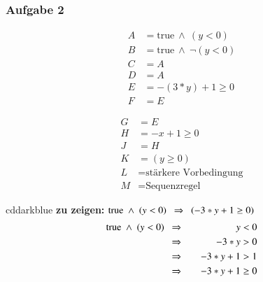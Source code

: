 \documentclass[aspectratio=1610,onlymath, ngerman, handout]{beamer}
\renewcommand{\emph}[1]{\textbf{#1}}
\newcommand{\logand}{ \ \land \ }
\begin{document}
	\begin{frame} \frametitle{Aufgabe 2}
		\pause
		\begin{minipage}{\dimexpr0.5\linewidth-\fboxrule-\fboxsep}
			\begin{align*}
				A &= \text{true} \logand (y < 0) \\
				B &= \text{true} \logand \lnot(y < 0) \\
				C &= A \\
				D &= A \\
				E &= -(3*y) + 1 \ge 0 \\
				F &= E 
				\end{align*}
		\end{minipage}
		\begin{minipage}{\dimexpr0.5\linewidth-\fboxrule-\fboxsep}
			\begin{align*}
				G &= E \\
				H &= -x + 1 \ge 0 \\
				J &= H \\
				K &= (y \ge 0) \\
				L &= \text{stärkere Vorbedingung} \\
				M &= \text{Sequenzregel} 
			\end{align*}
		\end{minipage}
	
		\bigskip
		\pause
		
		\begin{doodle}{cddarkblue}
			\emph{zu zeigen:} $\text{true} \ \land \ (y < 0) \enskip \Rightarrow \enskip (-3 * y + 1 \ge 0)$
			\begin{alignat*}{2}
			\text{true} \ \land \ (y < 0) \enskip &\Rightarrow \quad &y &< 0 \\
			&\Rightarrow \quad &-3 * y &> 0 \\ 
			&\Rightarrow \quad &-3 * y + 1 &> 1 \\ 
			&\Rightarrow \quad &-3 * y + 1 &\ge 0 
			\end{alignat*}
		\end{doodle}
		
	\end{frame}
    
    
\end{document}
